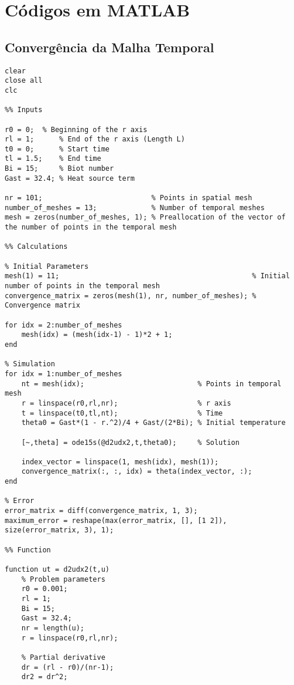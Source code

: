 \chapter{Códigos em MATLAB}

\section{Convergência da Malha Temporal}

\begin{lstlisting}
clear
close all
clc

%% Inputs

r0 = 0;  % Beginning of the r axis
rl = 1;      % End of the r axis (Length L)
t0 = 0;      % Start time
tl = 1.5;    % End time
Bi = 15;     % Biot number
Gast = 32.4; % Heat source term

nr = 101;                          % Points in spatial mesh
number_of_meshes = 13;             % Number of temporal meshes
mesh = zeros(number_of_meshes, 1); % Preallocation of the vector of the number of points in the temporal mesh

%% Calculations

% Initial Parameters
mesh(1) = 11;                                              % Initial number of points in the temporal mesh
convergence_matrix = zeros(mesh(1), nr, number_of_meshes); % Convergence matrix

for idx = 2:number_of_meshes
    mesh(idx) = (mesh(idx-1) - 1)*2 + 1;
end

% Simulation
for idx = 1:number_of_meshes
    nt = mesh(idx);                           % Points in temporal mesh
    r = linspace(r0,rl,nr);                   % r axis
    t = linspace(t0,tl,nt);                   % Time
    theta0 = Gast*(1 - r.^2)/4 + Gast/(2*Bi); % Initial temperature
    
    [~,theta] = ode15s(@d2udx2,t,theta0);     % Solution

    index_vector = linspace(1, mesh(idx), mesh(1));
    convergence_matrix(:, :, idx) = theta(index_vector, :);
end

% Error
error_matrix = diff(convergence_matrix, 1, 3);
maximum_error = reshape(max(error_matrix, [], [1 2]), size(error_matrix, 3), 1);

%% Function

function ut = d2udx2(t,u)
	% Problem parameters
	r0 = 0.001;
    rl = 1;
    Bi = 15;
    Gast = 32.4;
    nr = length(u);
    r = linspace(r0,rl,nr);
    
	% Partial derivative
	dr = (rl - r0)/(nr-1);
    dr2 = dr^2;
    

\end{lstlisting}
